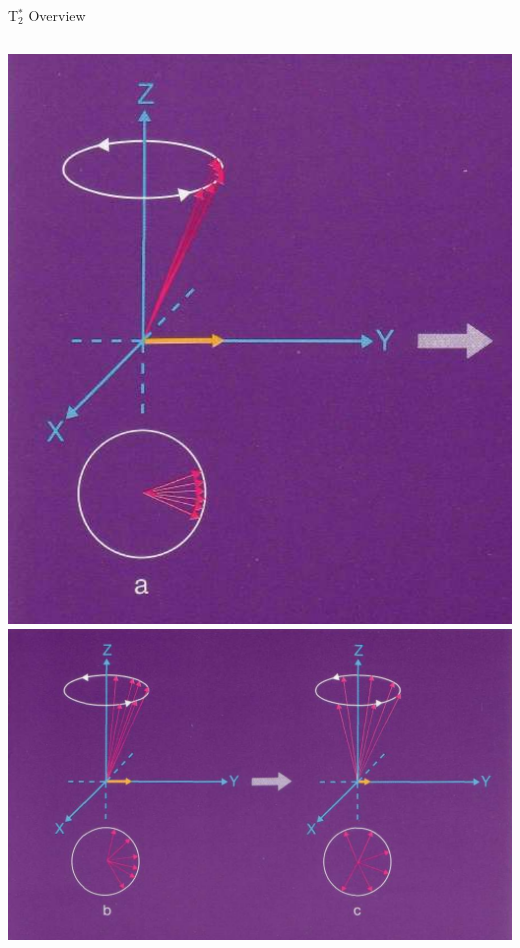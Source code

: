 \documentclass[aspectratio=169,xcolor=dvipsnames]{beamer}
\begin{document}
\begin{frame}{T$_{2}^{*}$ Overview}
\begin{columns}[c]
\includegraphics[width=1\textwidth]{imgs/transrelax}
\includegraphics[width=1\textwidth]{imgs/transrelax2}
\end{columns}

\end{frame}
\end{document}
